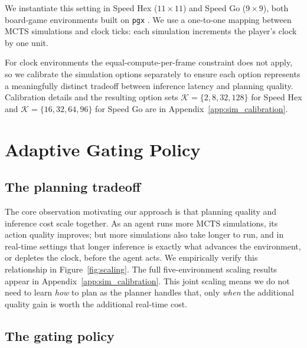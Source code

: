 \documentclass{article}
\newcommand{\Kset}{\mathcal{K}}
\begin{document}
We instantiate this setting in Speed Hex ($11 \times 11$) and Speed
Go ($9 \times 9$), both board-game environments built on \texttt{pgx} \citep{koyamada2023pgx}.
We use a one-to-one mapping between MCTS simulations and clock
ticks: each simulation increments the player's clock by one unit.

For clock environments the equal-compute-per-frame constraint does
not apply, so we calibrate the simulation options separately to
ensure each option represents a meaningfully distinct tradeoff
between inference latency and planning quality.
Calibration details and the resulting option sets
$\Kset = \{2, 8, 32, 128\}$ for Speed Hex and
$\Kset = \{16, 32, 64, 96\}$ for Speed Go are in
Appendix~\ref{app:sim_calibration}.
\section{Adaptive Gating Policy}
\label{sec:method}

\subsection{The planning tradeoff}

The core observation motivating our approach is that planning quality
and inference cost scale together.
As an agent runs more MCTS simulations, its action quality improves;
but more simulations also take longer to run, and in real-time
settings that longer inference is exactly what advances the
environment, or depletes the clock, before the agent acts.
We empirically verify this relationship in Figure~\ref{fig:scaling}.
The full five-environment scaling results appear in Appendix~\ref{app:sim_calibration}. This joint scaling means
we do not need to learn \emph{how} to plan as the planner handles
that, only \emph{when} the additional quality gain is worth the
additional real-time cost.


\subsection{The gating policy}
\end{document}
